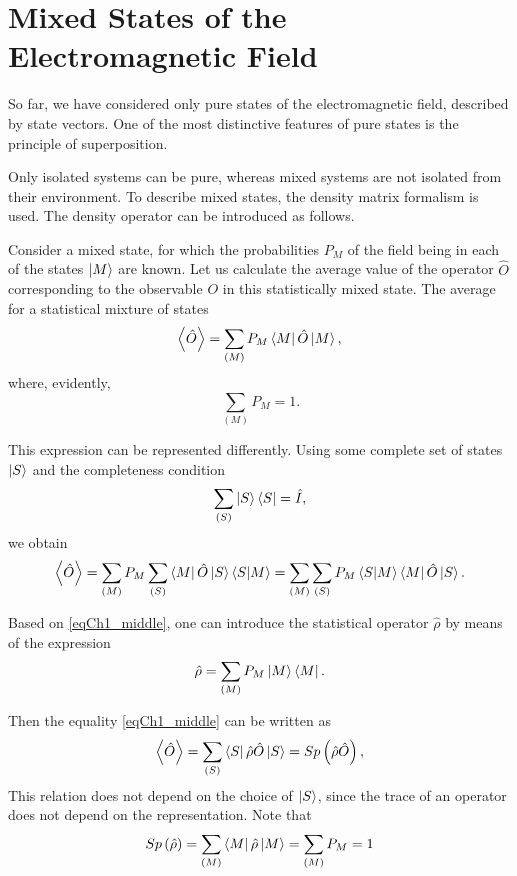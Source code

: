 \section{Mixed States of the Electromagnetic Field}
So far, we have considered only pure states of the electromagnetic
field, described by state vectors. 
One of the most distinctive features of pure states is
the principle of superposition. 

Only isolated systems can be pure, whereas
mixed systems are not isolated from their environment. To describe
mixed states, the density matrix formalism is used. The density operator can be introduced as follows.  

Consider a mixed state, 
for which the probabilities
$P_M$
of the field being in each of the states 
$\ket{M}$ are known.  Let us calculate the average value
of the operator $\hat{O}$ corresponding to the observable $O$ in this statistically
mixed state. The average for a statistical mixture of states  
\begin{equation}
\left<\hat{O}\right> = \sum_{(M)} P_M\bra{M}\hat{O}\ket{M},
\end{equation}
where, evidently, 
\[
\sum_{(M)} P_M = 1.
\]

This expression can be represented differently. Using some
complete set of states $\ket{S}$ and the completeness condition
\[
\sum_{(S)}\ket{S}\bra{S} = \hat{I},
\]
we obtain
\begin{equation}
\left<\hat{O}\right> = \sum_{(M)}
P_M\sum_{(S)}\bra{M}\hat{O}\ket{S}\bra{S}\ket{M}
= \sum_{(M)}\sum_{(S)}P_M\bra{S}\ket{M}\bra{M}\hat{O}\ket{S}.
\label{eqCh1_middle}
\end{equation}

Based on \eqref{eqCh1_middle}, one can introduce the statistical operator $\hat{\rho}$ by means of the expression
\begin{equation}
\hat{\rho} = \sum_{(M)}
P_M\ket{M}\bra{M}.
\end{equation}

Then the equality \eqref{eqCh1_middle} can be written as
\begin{equation}
\left<\hat{O}\right> = \sum_{(S)}
\bra{S}\hat{\rho}\hat{O}\ket{S} = Sp \left(\hat{\rho}\hat{O}\right),
\end{equation}
This relation does not depend on the choice of $\ket{S}$, since the trace
of an operator does not depend on the representation. Note that 
\begin{equation}
Sp \left(\hat{\rho}\right) = \sum_{(M)}
\bra{M}\hat{\rho}\ket{M} = \sum_{(M)} P_M = 1
\label{eqCh1_spequal1}
\end{equation}

